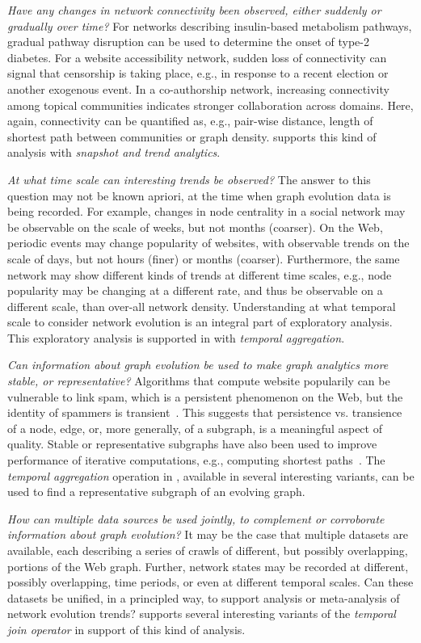 {\em Have any changes in network connectivity been observed, either
  suddenly or gradually over time?}  For networks describing
insulin-based metabolism pathways, gradual pathway disruption can be
used to determine the onset of type-2 diabetes.  For a website
accessibility network, sudden loss of connectivity can signal that
censorship is taking place, e.g., in response to a recent election or
another exogenous event.  In a co-authorship network, increasing
connectivity among topical communities indicates stronger
collaboration across domains.  Here, again, connectivity can be
quantified as, e.g., pair-wise distance, length of shortest path
between communities or graph density.  \ql supports this kind of
analysis with {\em snapshot and trend analytics}.

{\em At what time scale can interesting trends be observed?} The
answer to this question may not be known apriori, at the time when
graph evolution data is being recorded.  For example, changes in node
centrality in a social network may be observable on the scale of
weeks, but not months (coarser).  On the Web, periodic events may
change popularity of websites, with observable trends on the scale of
days, but not hours (finer) or months (coarser).  Furthermore, the
same network may show different kinds of trends at different time
scales, e.g., node popularity may be changing at a different rate, and
thus be observable on a different scale, than over-all network
density.  Understanding at what temporal scale to consider network
evolution is an integral part of exploratory analysis.  This
exploratory analysis is supported in \ql with {\em temporal
  aggregation}.

{\em Can information about graph evolution be used to make graph
  analytics more stable, or representative?}  Algorithms that compute
website popularily can be vulnerable to link spam, which is a
persistent phenomenon on the Web, but the identity of spammers is
transient~\cite{DBLP:conf/cikm/YangQZGL07}.  This suggests that
persistence vs. transience of a node, edge, or, more generally, of a
subgraph, is a meaningful aspect of quality.  Stable or representative
subgraphs have also been used to improve performance of iterative
computations, e.g., computing shortest paths~\cite{Ren2011}.  The {\em
  temporal aggregation} operation in \ql, available in several
interesting variants, can be used to find a representative subgraph of
an evolving graph.

{\em How can multiple data sources be used jointly, to complement or
  corroborate information about graph evolution?}  It may be the case
that multiple datasets are available, each describing a series of
crawls of different, but possibly overlapping, portions of the Web
graph.  Further, network states may be recorded at different, possibly
overlapping, time periods, or even at different temporal scales.  Can
these datasets be unified, in a principled way, to support analysis or
meta-analysis of network evolution trends?  \ql supports several
interesting variants of the {\em temporal join operator} in support of
this kind of analysis.


